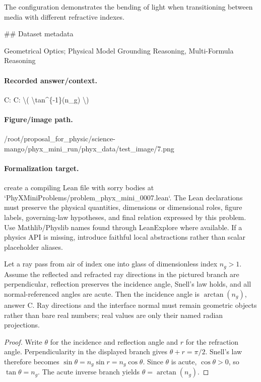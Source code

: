 The configuration demonstrates the bending of light when transitioning between media with different refractive indexes.

\#\# Dataset metadata

Geometrical Optics; Physical Model Grounding Reasoning, Multi-Formula Reasoning

\paragraph{Recorded answer/context.}
C: C: \textbackslash{}( \textbackslash{}tan\textasciicircum{}\{-1\}(n\_g) \textbackslash{})

\paragraph{Figure/image path.}
/root/proposal\_for\_physic/science-mango/phyx\_mini\_run/phyx\_data/test\_image/7.png

\paragraph{Formalization target.}
create a compiling Lean file with sorry bodies at `PhyXMiniProblems/problem\_phyx\_mini\_0007.lean`. The Lean declarations must preserve the physical quantities, dimensions or dimensional roles, figure labels, governing-law hypotheses, and final relation expressed by this problem.
Use Mathlib/Physlib names found through LeanExplore where available. If a physics API is missing, introduce faithful local abstractions rather than scalar placeholder aliases.

\begin{theorem}
\label{thm:physics:phyx_mini_0007:target}
Let a ray pass from air of index one into glass of dimensionless index
$n_g>1$. Assume the reflected and refracted ray directions in the pictured
branch are perpendicular, reflection preserves the incidence angle, Snell's
law holds, and all normal-referenced angles are acute. Then the incidence
angle is $\arctan(n_g)$, answer C. Ray directions and the interface normal
must remain geometric objects rather than bare real numbers; real values are
only their named radian projections.
\end{theorem}
\begin{proof}
Write $\theta$ for the incidence and reflection angle and $r$ for the
refraction angle. Perpendicularity in the displayed branch gives
$\theta+r=\pi/2$. Snell's law therefore becomes
$\sin\theta=n_g\sin r=n_g\cos\theta$. Since $\theta$ is acute,
$\cos\theta>0$, so $\tan\theta=n_g$. The acute inverse branch yields
$\theta=\arctan(n_g)$.
\end{proof}

